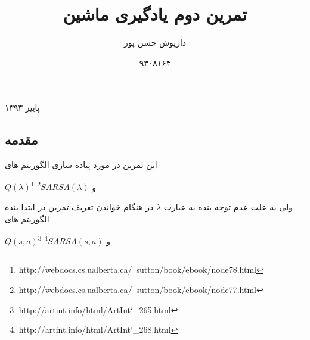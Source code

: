 \documentclass[10pt,a4paper]{article}
\begin{document}
\title{\textarabic{تمرین دوم یادگیری ماشین}}
\author{\textarabic{داریوش حسن پور}}
\date{\textarabic{۹۳۰۸۱۶۴}}
\maketitle
\null
\vfill
\begin{center}
\textarabic{پاییز ۱۳۹۳}
\end{center}
\newpage

\begin{Arabic}
\section{\textarabic{مقدمه}}
این تمرین در مورد پیاده سازی الگوریتم های 
\end{Arabic}
\textenglish{$Q(\lambda)$\footnote{http://webdocs.cs.ualberta.ca/~sutton/book/ebook/node78.html}}
\textarabic{و}
\textenglish{$SARSA(\lambda)$\footnote{http://webdocs.cs.ualberta.ca/~sutton/book/ebook/node77.html}}
\begin{Arabic}
ولی به علت عدم توجه بنده به عبارت 
$\lambda$
در هنگام خواندن تعریف تمرین در ابتدا بنده الگوریتم های 
\end{Arabic}
\textenglish{$Q(s, a)$\footnote{http://artint.info/html/ArtInt\char`_265.html}}
\textarabic{و}
\textenglish{$SARSA(s, a)$\footnote{http://artint.info/html/ArtInt\char`_268.html}}
\end{document}
